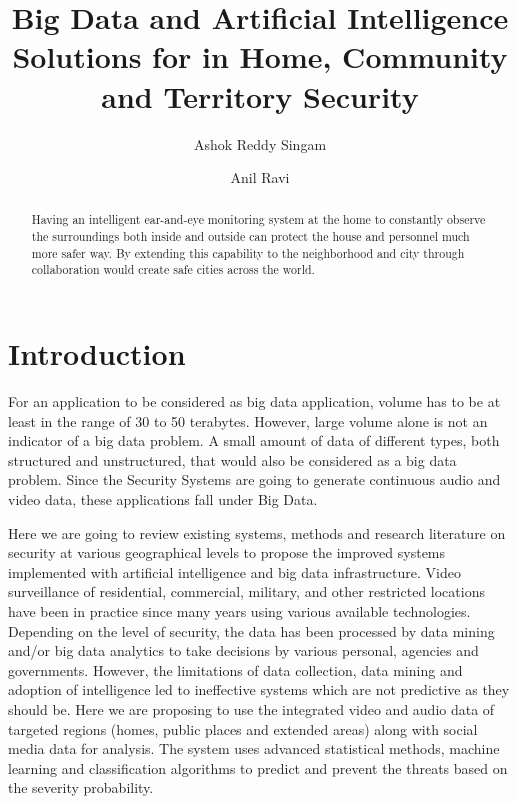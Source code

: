 \documentclass[sigconf]{acmart}
\begin{document}
\title{Big Data and Artificial Intelligence Solutions for in Home, Community and Territory Security}


\author{Ashok Reddy Singam}

\author{Anil Ravi}

\begin{abstract}
Having an intelligent ear-and-eye monitoring system at the home to constantly observe the surroundings both inside and outside can protect the house and personnel much more safer way. By extending this capability to the neighborhood and city through collaboration would create safe cities across the world.

\end{abstract}


\maketitle

\section{Introduction}
For an application to be considered as big data application, volume has to be at least in the range of 30 to 50 terabytes. 
However, large volume alone is not an indicator of a big data problem. A small amount of data of different types, both structured and unstructured, that would also be considered as a big data problem. Since the Security Systems are going to generate continuous audio and video data, these applications fall under Big Data.

Here we are going to review existing systems, methods and research literature on security at various geographical levels to propose the improved systems implemented with artificial intelligence and big data infrastructure. Video surveillance of residential, commercial, military, and other restricted locations have been in practice since many years using various available technologies. 
Depending on the level of security, the data has been processed by data mining and/or big data analytics to take decisions by various personal, agencies and governments. 
However, the limitations of data collection, data mining and adoption of intelligence led to ineffective systems which are not predictive as they should be. 
Here we are proposing to use the integrated video and audio data of targeted regions (homes, public places and extended areas) along with social media data for analysis. 
The system uses advanced statistical methods, machine learning and classification algorithms to predict and prevent the threats based on the severity probability.
\end{document}
